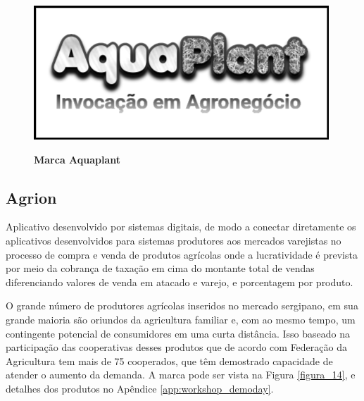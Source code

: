 \begin{figure}[H]
\centering
\caption{\textbf{Marca Aquaplant}}
\includegraphics[scale=0.5]{Imagens/aquaplant.png}
\label{figura_13}
\end{figure}


\subsection{Agrion}

Aplicativo desenvolvido por sistemas digitais, de modo a conectar diretamente os aplicativos desenvolvidos para sistemas produtores aos mercados varejistas no processo de compra e venda de produtos agrícolas onde a lucratividade é prevista por meio da cobrança de taxação em cima do montante total de vendas diferenciando valores de venda em atacado e varejo, e porcentagem por produto.


O grande número de produtores agrícolas inseridos no mercado sergipano, em sua grande maioria são oriundos da agricultura familiar e, com ao mesmo tempo, um contingente potencial de consumidores em uma curta distância. Isso baseado na participação das cooperativas desses produtos que de acordo com Federação da Agricultura tem mais de 75 cooperados, que têm demostrado capacidade de atender o aumento da demanda. A marca pode ser vista na Figura \ref{figura_14}, e detalhes dos produtos no Apêndice \ref{app:workshop_demoday}.


